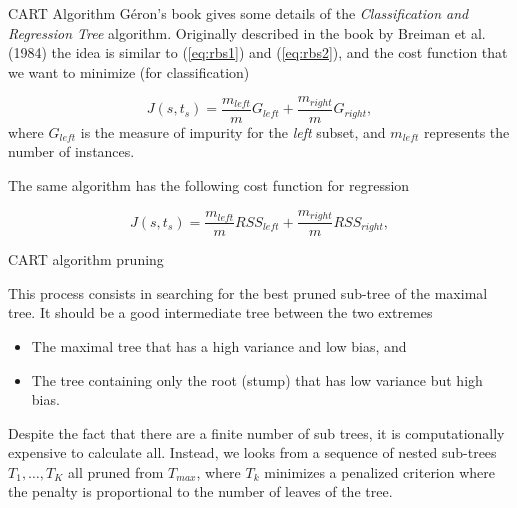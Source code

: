 \documentclass{beamer}
\begin{document}
\begin{frame}{CART Algorithm}
	G\'eron's book gives some details of the {\it Classification and Regression Tree}  algorithm. Originally described in the book by Breiman et al. (1984) the idea is similar to (\ref{eq:rbs1}) and (\ref{eq:rbs2}), and the cost function that we want to minimize (for classification)
	
	\begin{equation}
		J(s,t_s) = \frac{m_{left}}{m} G_{left}+ \frac{m_{right}}{m} G_{right},
	\end{equation}
where $G_{left}$ is the measure of impurity for the {\it left} subset, and $m_{left}$ represents the number of instances. 

The same algorithm has the following cost function for regression 

\begin{equation*}
	J(s,t_s)= \frac{m_{left}}{m} RSS_{left}+ \frac{m_{right}}{m} RSS_{right},
\end{equation*}

\end{frame}

\begin{frame}{CART algorithm pruning}

This process consists in searching for the best pruned sub-tree of the maximal tree.  It should be a good intermediate tree between the two extremes

\begin{itemize}
	\item The maximal tree that has a high variance and low bias, and
	\item The tree containing only the root (stump) that has low variance but high bias.
\end{itemize}

Despite the fact that there are a finite number of sub trees, it is computationally expensive to calculate all. Instead, we looks from a sequence of nested sub-trees $T_1,\ldots, T_K$ all pruned from $T_{max}$, where $T_k$ minimizes a penalized criterion where the penalty is proportional to the number of leaves of the tree. 

\end{frame} 
\end{document}
